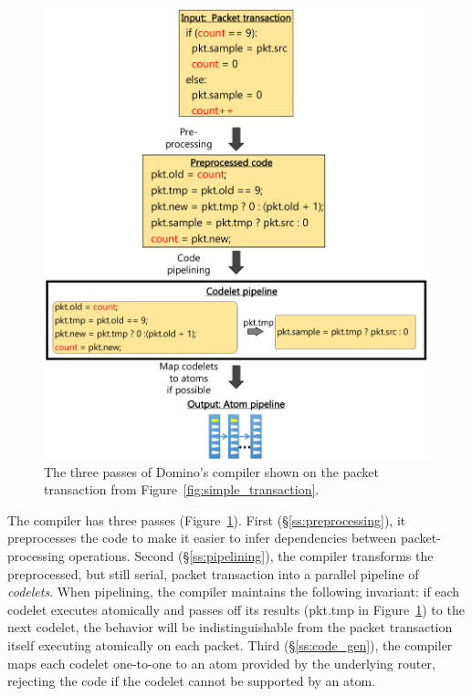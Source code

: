 \begin{figure}[!t]
\includegraphics[width=\textwidth]{compiler_passes_example.pdf}
\caption{The three passes of Domino's compiler shown on the packet transaction
from Figure~\ref{fig:simple_transaction}.}
\label{fig:compiler_passes_example}
\end{figure}

The compiler has three passes (Figure~\ref{fig:compiler_passes_example}). First
(\S\ref{ss:preprocessing}), it preprocesses the code to make it easier to infer
dependencies between packet-processing operations. Second
(\S\ref{ss:pipelining}), the compiler transforms the preprocessed, but still
serial, packet transaction into a parallel pipeline of {\em codelets}.  When
pipelining, the compiler maintains the following invariant: if each codelet executes
atomically and passes off its results (\eg pkt.tmp in
Figure~\ref{fig:compiler_passes_example}) to the next codelet, the behavior
will be indistinguishable from the packet transaction itself executing
atomically on each packet. Third (\S\ref{ss:code_gen}), the compiler maps each
codelet one-to-one to an atom provided by the underlying router, rejecting the
code if the codelet cannot be supported by an atom.

